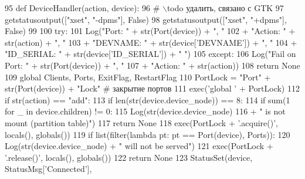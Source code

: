 \begin{DoxyCode}
95 \textcolor{keyword}{def }DeviceHandler(action, device):
96     \textcolor{comment}{# \(\backslash\)todo удалить, связано с GTK}
97     getstatusoutput([\textcolor{stringliteral}{"xset"}, \textcolor{stringliteral}{"-dpms"}], \textcolor{keyword}{False})
98     getstatusoutput([\textcolor{stringliteral}{"xset"}, \textcolor{stringliteral}{"+dpms"}], \textcolor{keyword}{False})
99 
100     \textcolor{keywordflow}{try}:
101         Log(\textcolor{stringliteral}{"Port: "} + str(Port(device)) + \textcolor{stringliteral}{", "}
102             + \textcolor{stringliteral}{"Action: "} + str(action) + \textcolor{stringliteral}{", "}
103             + \textcolor{stringliteral}{"DEVNAME: "} + str(device[\textcolor{stringliteral}{'DEVNAME'}]) + \textcolor{stringliteral}{", "}
104             + \textcolor{stringliteral}{"ID\_SERIAL: "} + str(device[\textcolor{stringliteral}{'ID\_SERIAL'}]) + \textcolor{stringliteral}{" "})
105     \textcolor{keywordflow}{except}:
106         Log(\textcolor{stringliteral}{"Fail on Port: "} + str(Port(device)) + \textcolor{stringliteral}{", "}
107             + \textcolor{stringliteral}{"Action: "} + str(action))
108         \textcolor{keywordflow}{return} \textcolor{keywordtype}{None}
109     \textcolor{keyword}{global} Clients, Ports, ExitFlag, RestartFlag
110     PortLock = \textcolor{stringliteral}{"Port"} + str(Port(device)) + \textcolor{stringliteral}{"Lock"} \textcolor{comment}{# закрытие портов}
111     exec(\textcolor{stringliteral}{'global '} + PortLock)
112     \textcolor{keywordflow}{if} str(action) == \textcolor{stringliteral}{"add"}:
113         \textcolor{keywordflow}{if} len(str(device.device\_node)) == 8:
114             \textcolor{keywordflow}{if} sum(1 \textcolor{keywordflow}{for} \_ \textcolor{keywordflow}{in} device.children) != 0:
115                 Log(str(device.device\_node)
116                     + \textcolor{stringliteral}{" is not mount (partition table)"})
117                 \textcolor{keywordflow}{return} \textcolor{keywordtype}{None}
118                 exec(PortLock + \textcolor{stringliteral}{'.acquire()'}, locals(), globals())
119         \textcolor{keywordflow}{if} list(filter(\textcolor{keyword}{lambda} pt: pt == Port(device), Ports)):
120             Log(str(device.device\_node) + \textcolor{stringliteral}{" will not be served"})
121             exec(PortLock + \textcolor{stringliteral}{'.release()'}, locals(), globals())
122             \textcolor{keywordflow}{return} \textcolor{keywordtype}{None}
123         StatusSet(device, StatusMsg[\textcolor{stringliteral}{'Connected'}],

\end{DoxyCode}
